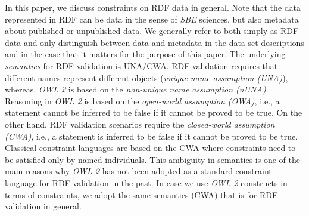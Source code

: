 \documentclass[conference]{IEEEtran}
\newcommand{\ms}[1]{\texttt{#1}}
\newcommand{\tb}[1]{\todo[size=\small, color=green!40]{\textbf{Thomas:} #1}}
\begin{document}
In this paper, we discuss constraints on RDF data in general. Note that the data represented in RDF can be data in the sense of \emph{SBE} sciences, but also metadata about published or unpublished data. We generally refer to both simply as RDF data and only distinguish between data and metadata in the data set descriptions and in the case that it matters for the purpose of this paper.
The underlying \emph{semantics} for RDF validation is UNA/CWA.
RDF validation requires that different names represent different objects ({\em unique name assumption (UNA)}), whereas,
\emph{OWL 2} is based on the {\em non-unique name assumption (nUNA)}.  
Reasoning in \emph{OWL 2} is based on the {\em open-world assumption (OWA)}, i.e., a statement cannot be inferred to be false if it cannot be proved to be true. 
On the other hand, RDF validation scenarios require the {\em closed-world assumption (CWA)}, i.e., a statement is inferred to be false if it cannot be proved to be true. Classical constraint languages are based on the CWA where constraints need to be satisfied only by named individuals.
This ambiguity in semantics is one of the main reasons why \emph{OWL 2} has not been adopted as a standard constraint language for RDF validation in the past.  
In case we use \emph{OWL 2} constructs in terms of constraints, we adopt the same semantics (CWA) that is for RDF validation in general.
\end{document}
